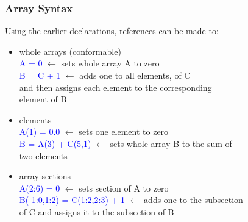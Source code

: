 \documentclass[11pt]{beamer}
\begin{document}

\begin{frame}[fragile]
\frametitle{Array Syntax}

Using the earlier declarations, references can be made to:

\begin{itemize}
\item whole arrays (conformable)\\
\quad \textcolor{blue}{A = 0} $\leftarrow$ sets whole array A to zero \\
\quad \textcolor{blue}{B = C + 1} $\leftarrow$ adds one to all elements, of C \\
\quad \quad \quad and then assigns each element to the corresponding \\
\quad \quad \quad element of B \\

\item elements \\
\quad \textcolor{blue}{A(1) = 0.0} $\leftarrow$ sets one element to zero \\
\quad \textcolor{blue}{B = A(3) + C(5,1)} $\leftarrow$ sets whole array B to the sum of \\
\quad \quad \quad two elements\\

\item array sections \\
\quad \textcolor{blue}{A(2:6) = 0} $\leftarrow$ sets section of A to zero \\
\quad \textcolor{blue}{B(-1:0,1:2) = C(1:2,2:3) + 1} $\leftarrow$  adds one to the subsection \\
\quad \quad \quad of C and assigns it to the subsection of B \\
 \end{itemize}
 
\end{frame}

\end{document}
